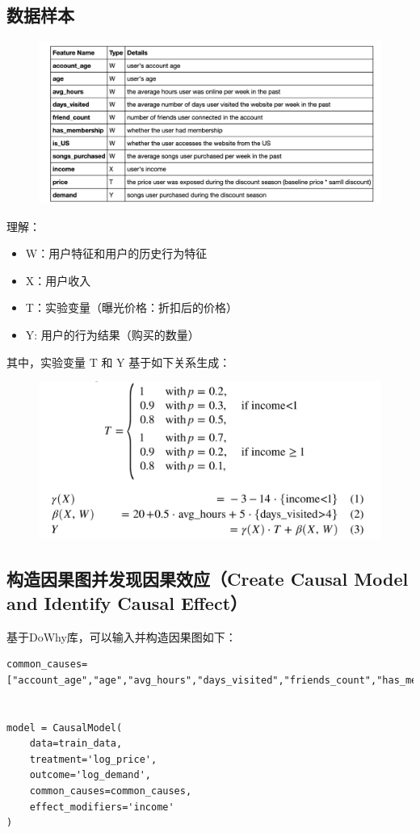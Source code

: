 \documentclass[12pt]{article}
\begin{document}
\subsection{数据样本}
\begin{figure}[H]
    \centering
    \includegraphics[width=1\textwidth]{fig/Casual_Inference_Microsoft_Example_1.png}
\end{figure}
\begin{framed}
理解：
\begin{itemize}
\setlength{\itemsep}{0pt}
\setlength{\parsep}{0pt}
\setlength{\parskip}{0pt}
    \item W：用户特征和用户的历史行为特征
    \item X：用户收入
    \item T：实验变量（曝光价格：折扣后的价格）
    \item Y:  用户的行为结果（购买的数量）
\end{itemize}
\end{framed}

其中，实验变量 T 和 Y 基于如下关系生成：
\begin{figure}[H]
    \centering
    \includegraphics[width=.6\textwidth]{fig/Casual_Inference_Microsoft_Example_2.png}
\end{figure}

\subsection{构造因果图并发现因果效应（Create Causal Model and Identify Causal Effect）}
基于DoWhy库，可以输入并构造因果图如下：
\begin{lstlisting}
common_causes=["account_age","age","avg_hours","days_visited","friends_count","has_membership","is_US","songs_purchased","income"]


model = CausalModel(
    data=train_data, 
    treatment='log_price', 
    outcome='log_demand', 
    common_causes=common_causes,
    effect_modifiers='income'
)
\end{lstlisting}
\end{document}
